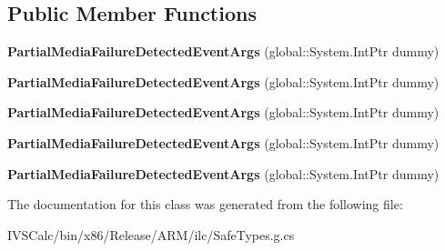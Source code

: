 \subsection*{Public Member Functions}
\begin{DoxyCompactItemize}
\item 
\mbox{\label{class_windows_1_1_u_i_1_1_xaml_1_1_media_1_1_partial_media_failure_detected_event_args_a7fc0d1e3f9b6bae1a2467298908a9fed}} 
{\bfseries Partial\+Media\+Failure\+Detected\+Event\+Args} (global\+::\+System.\+Int\+Ptr dummy)
\item 
\mbox{\label{class_windows_1_1_u_i_1_1_xaml_1_1_media_1_1_partial_media_failure_detected_event_args_a7fc0d1e3f9b6bae1a2467298908a9fed}} 
{\bfseries Partial\+Media\+Failure\+Detected\+Event\+Args} (global\+::\+System.\+Int\+Ptr dummy)
\item 
\mbox{\label{class_windows_1_1_u_i_1_1_xaml_1_1_media_1_1_partial_media_failure_detected_event_args_a7fc0d1e3f9b6bae1a2467298908a9fed}} 
{\bfseries Partial\+Media\+Failure\+Detected\+Event\+Args} (global\+::\+System.\+Int\+Ptr dummy)
\item 
\mbox{\label{class_windows_1_1_u_i_1_1_xaml_1_1_media_1_1_partial_media_failure_detected_event_args_a7fc0d1e3f9b6bae1a2467298908a9fed}} 
{\bfseries Partial\+Media\+Failure\+Detected\+Event\+Args} (global\+::\+System.\+Int\+Ptr dummy)
\item 
\mbox{\label{class_windows_1_1_u_i_1_1_xaml_1_1_media_1_1_partial_media_failure_detected_event_args_a7fc0d1e3f9b6bae1a2467298908a9fed}} 
{\bfseries Partial\+Media\+Failure\+Detected\+Event\+Args} (global\+::\+System.\+Int\+Ptr dummy)
\end{DoxyCompactItemize}


The documentation for this class was generated from the following file\+:\begin{DoxyCompactItemize}
\item 
I\+V\+S\+Calc/bin/x86/\+Release/\+A\+R\+M/ilc/Safe\+Types.\+g.\+cs\end{DoxyCompactItemize}
